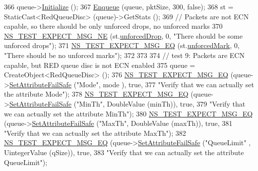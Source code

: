 \begin{DoxyCode}
366   queue->\hyperlink{classns3_1_1Object_af4411cb29971772fcd09203474a95078}{Initialize} ();
367   \hyperlink{classRedQueueDiscTestCase_a231b433374e4485d83bcca3088685e31}{Enqueue} (queue, pktSize, 300, \textcolor{keyword}{false});
368   st = StaticCast<RedQueueDisc> (queue)->GetStats ();
369   \textcolor{comment}{// Packets are not ECN capable, so there should be only unforced drops, no unforced marks}
370   \hyperlink{group__testing_ga6d4b162d26b8a930115b97dd5f3d9ed9}{NS\_TEST\_EXPECT\_MSG\_NE} (st.\hyperlink{structns3_1_1RedQueueDisc_1_1Stats_a242027f6eb7d30e2cd636c52080e2c73}{unforcedDrop}, 0, \textcolor{stringliteral}{"There should be some
       unforced drops"});
371   \hyperlink{group__testing_ga7304ba46a28d8cf08dfdfd6499cf7068}{NS\_TEST\_EXPECT\_MSG\_EQ} (st.\hyperlink{structns3_1_1RedQueueDisc_1_1Stats_aa974fb3ee97c612e0a6d77259a3672df}{unforcedMark}, 0, \textcolor{stringliteral}{"There should be no unforced
       marks"});
372 
373 
374   \textcolor{comment}{// test 9: Packets are ECN capable, but RED queue disc is not ECN enabled}
375   queue = CreateObject<RedQueueDisc> ();
376   \hyperlink{group__testing_ga7304ba46a28d8cf08dfdfd6499cf7068}{NS\_TEST\_EXPECT\_MSG\_EQ} (queue->\hyperlink{classns3_1_1ObjectBase_aa7d333004e970f925a4ed5df275541b5}{SetAttributeFailSafe} (\textcolor{stringliteral}{"Mode"}, mode
      ), \textcolor{keyword}{true},
377                          \textcolor{stringliteral}{"Verify that we can actually set the attribute Mode"});
378   \hyperlink{group__testing_ga7304ba46a28d8cf08dfdfd6499cf7068}{NS\_TEST\_EXPECT\_MSG\_EQ} (queue->\hyperlink{classns3_1_1ObjectBase_aa7d333004e970f925a4ed5df275541b5}{SetAttributeFailSafe} (\textcolor{stringliteral}{"MinTh"}, 
      DoubleValue (minTh)), \textcolor{keyword}{true},
379                          \textcolor{stringliteral}{"Verify that we can actually set the attribute MinTh"});
380   \hyperlink{group__testing_ga7304ba46a28d8cf08dfdfd6499cf7068}{NS\_TEST\_EXPECT\_MSG\_EQ} (queue->\hyperlink{classns3_1_1ObjectBase_aa7d333004e970f925a4ed5df275541b5}{SetAttributeFailSafe} (\textcolor{stringliteral}{"MaxTh"}, 
      DoubleValue (maxTh)), \textcolor{keyword}{true},
381                          \textcolor{stringliteral}{"Verify that we can actually set the attribute MaxTh"});
382   \hyperlink{group__testing_ga7304ba46a28d8cf08dfdfd6499cf7068}{NS\_TEST\_EXPECT\_MSG\_EQ} (queue->\hyperlink{classns3_1_1ObjectBase_aa7d333004e970f925a4ed5df275541b5}{SetAttributeFailSafe} (\textcolor{stringliteral}{"QueueLimit"}
      , UintegerValue (qSize)), \textcolor{keyword}{true},
383                          \textcolor{stringliteral}{"Verify that we can actually set the attribute QueueLimit"});

\end{DoxyCode}
